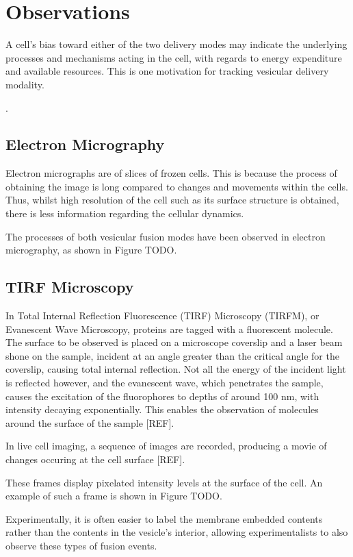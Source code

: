 \documentclass{report}
\begin{document}
\section{Observations}
A cell's bias toward either of the two delivery modes may indicate the underlying processes and mechanisms acting in the cell, with regards to energy expenditure and available resources. This is one motivation for tracking vesicular delivery modality.

\cite{sochacki2012imaging}.

\subsection{Electron Micrography}
Electron micrographs are of slices of frozen cells. This is because the process of obtaining the image is long compared to changes and movements within the cells. Thus, whilst high resolution of the cell such as its surface structure is obtained, there is less information regarding the cellular dynamics.

The processes of both vesicular fusion modes have been observed in electron micrography, as shown in Figure TODO.

\subsection{TIRF Microscopy}
In Total Internal Reflection Fluorescence (TIRF) Microscopy (TIRFM), or Evanescent Wave Microscopy, proteins are tagged with a fluorescent molecule. The surface to be observed is placed on a microscope coverslip and a laser beam shone on the sample, incident at an angle greater than the critical angle for the coverslip, causing total internal reflection. Not all the energy of the incident light is reflected however, and the evanescent wave, which penetrates the sample, causes the excitation of the fluorophores to depths of around 100 nm, with intensity decaying exponentially. This enables the observation of molecules around the surface of the sample [REF].

In live cell imaging, a sequence of images are recorded, producing a movie of changes occuring at the cell surface [REF].

These frames display pixelated intensity levels at the surface of the cell. An example of such a frame is shown in Figure TODO.

Experimentally, it is often easier to label the membrane embedded contents rather than the contents in the vesicle's interior, allowing experimentalists to also observe these types of fusion events.
\end{document}
